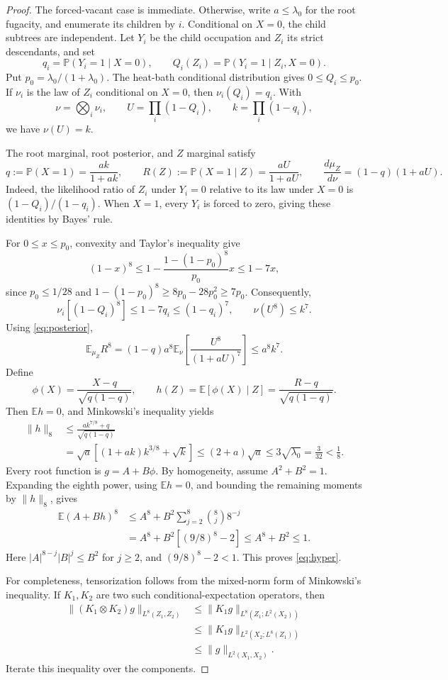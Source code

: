 \documentclass[11pt]{article}
\newcommand{\E}{\mathbb E}
\newcommand{\Prb}{\mathbb P}
\begin{document}
\begin{proof}
The forced-vacant case is immediate. Otherwise, write $a\le\lambda_0$ for the root fugacity, and enumerate its children by $i$. Conditional on $X=0$, the child subtrees are independent. Let $Y_i$ be the child occupation and $Z_i$ its strict descendants, and set
\[
q_i=\Prb(Y_i=1\mid X=0),\qquad
Q_i(Z_i)=\Prb(Y_i=1\mid Z_i,X=0).
\]
Put $p_0=\lambda_0/(1+\lambda_0)$. The heat-bath conditional distribution gives $0\le Q_i\le p_0$. If $\nu_i$ is the law of $Z_i$ conditional on $X=0$, then $\nu_i(Q_i)=q_i$. With
\[
\nu=\bigotimes_i\nu_i,\qquad
U=\prod_i(1-Q_i),\qquad
k=\prod_i(1-q_i),
\]
we have $\nu(U)=k$.

The root marginal, root posterior, and $Z$ marginal satisfy
\begin{equation}\label{eq:posterior}
q:=\Prb(X=1)=\frac{ak}{1+ak},\qquad
R(Z):=\Prb(X=1\mid Z)=\frac{aU}{1+aU},\qquad
\frac{d\mu_Z}{d\nu}=(1-q)(1+aU).
\end{equation}
Indeed, the likelihood ratio of $Z_i$ under $Y_i=0$ relative to its law under $X=0$ is $(1-Q_i)/(1-q_i)$. When $X=1$, every $Y_i$ is forced to zero, giving these identities by Bayes' rule.

For $0\le x\le p_0$, convexity and Taylor's inequality give
\[
(1-x)^8\le1-\frac{1-(1-p_0)^8}{p_0}x\le1-7x,
\]
since $p_0\le1/28$ and $1-(1-p_0)^8\ge8p_0-28p_0^2\ge7p_0$. Consequently,
\[
\nu_i[(1-Q_i)^8]\le1-7q_i\le(1-q_i)^7,
\qquad \nu(U^8)\le k^7.
\]
Using \eqref{eq:posterior},
\[
\E_{\mu_Z}R^8
=(1-q)a^8\E_\nu\!\left[\frac{U^8}{(1+aU)^7}\right]
\le a^8k^7.
\]
Define
\[
\phi(X)=\frac{X-q}{\sqrt{q(1-q)}},\qquad
h(Z)=\E[\phi(X)\mid Z]=\frac{R-q}{\sqrt{q(1-q)}}.
\]
Then $\E h=0$, and Minkowski's inequality yields
\begin{align*}
\|h\|_8
&\le\frac{ak^{7/8}+q}{\sqrt{q(1-q)}}\\
&=\sqrt a\left[(1+ak)k^{3/8}+\sqrt k\right]
\le(2+a)\sqrt a\le3\sqrt{\lambda_0}=\frac3{32}<\frac18.
\end{align*}
Every root function is $g=A+B\phi$. By homogeneity, assume $A^2+B^2=1$. Expanding the eighth power, using $\E h=0$, and bounding the remaining moments by $\|h\|_8$, gives
\begin{align*}
\E(A+Bh)^8
&\le A^8+B^2\sum_{j=2}^8\binom8j8^{-j}\\
&=A^8+B^2\left[(9/8)^8-2\right]
\le A^8+B^2\le1.
\end{align*}
Here $|A|^{8-j}|B|^j\le B^2$ for $j\ge2$, and $(9/8)^8-2<1$. This proves \eqref{eq:hyper}.

For completeness, tensorization follows from the mixed-norm form of Minkowski's inequality. If $K_1,K_2$ are two such conditional-expectation operators, then
\begin{align*}
\|(K_1\otimes K_2)g\|_{L^8(Z_1,Z_2)}
&\le\|K_1g\|_{L^8(Z_1;L^2(X_2))}\\
&\le\|K_1g\|_{L^2(X_2;L^8(Z_1))}\\
&\le\|g\|_{L^2(X_1,X_2)}.
\end{align*}
Iterate this inequality over the components.
\end{proof}
\end{document}
